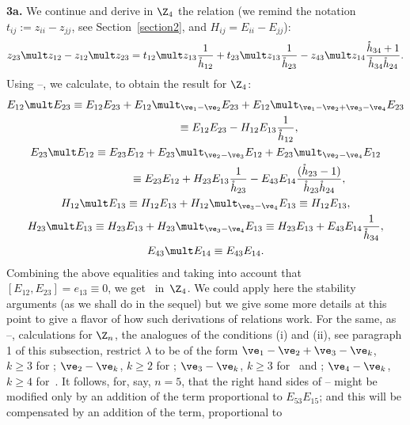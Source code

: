 \documentclass[11pt]{article}
\def\nplus{\mathfrak{n}}\def\nn{\nonumber}\def\nin{\noindent}
\def\s{z}\def\S{\mathrm {S}}\def\si{\sigma}\def\Sp{\S^{\nplus}}\def\sy{\acute{\sigma}}\def\th{\mathring{h}}
\numberwithin{equation}{section}
\begin{document}
{\bf 3a.} We continue and derive in $\Z_4$ the relation (we remind the notation $t_{ij}:=\s_{ii}-\s_{jj}$,
see Section~\ref{section2},
and $H_{ij}=E_{ii}-E_{jj}$):
\begin{gather} \label{proof12}
\s_{23}\mult\s_{12}-\s_{12}\mult\s_{23}=t_{12}\mult\s_{13}
 \frac{1}{\th_{12}}+t_{23}\mult\s_{13}  \frac{1}{\th_{23}}-\s_{43}\mult\s_{14}  \frac{\th_{34}+1}{\th_{34}\th_{24}}  .
\end{gather}
Using --, we calculate, to obtain the result for $\Z_4$:
\begin{gather}E_{12}\mult E_{23} \equiv E_{12}E_{23}+ E_{12}\mult_{\ve_1-\ve_2} E_{23}+
E_{12}\mult_{\ve_1-\ve_2+\ve_3-\ve_4} E_{23} \nonumber\\
\phantom{E_{12}\mult E_{23}}{}
 \equiv E_{12}E_{23}-H_{12}E_{13} \frac{1}{\th_{12}}  ,\label{1223r1}\\
  E_{23}\mult E_{12} \equiv E_{23}E_{12}+ E_{23}\mult_{\ve_2-\ve_3} E_{12}+
E_{23}\mult_{\ve_2-\ve_4} E_{12}\notag\\
\phantom{E_{23}\mult E_{12}}{} \equiv E_{23}E_{12}+H_{23}E_{13}  \frac{1}{\th_{23}}-E_{43}E_{14} \frac{(\th_{23}-1)}{\th_{23}
\th_{24}} ,\label{1223r2}\\
  H_{12}\mult E_{13} \equiv H_{12} E_{13}+H_{12}\mult_{\ve_3-\ve_4} E_{13}\equiv
H_{12} E_{13}  ,\label{1223r3}\\
  H_{23}\mult E_{13} \equiv H_{23} E_{13}+H_{23}\mult_{\ve_3-\ve_4} E_{13}\equiv
H_{23} E_{13}+E_{43}E_{14}  \frac{1}{\th_{34}}  ,\label{1223r4}\\
  E_{43}\mult E_{14} \equiv E_{43}E_{14} .\label{1223r5}
  \end{gather}
Combining the above equalities and taking into account that $[E_{12},E_{23}]=e_{13}\equiv 0$,
we get~ in~$\Z_4$. We could apply here the stability arguments (as we shall do in the sequel)
but we give some more details at this point to give a f\/lavor of how such derivations of relations work.
For the same, as --, calculations for $\Z_n$, the analogues of the conditions (i)
and (ii), see paragraph 1 of this subsection, restrict $\lambda$ to be of the form $\ve_1-\ve_2+\ve_3-\ve_k$, $k\geq 3$ for
; $\ve_2-\ve_k$, $k\geq 2$ for ; $\ve_3-\ve_k$, $k\geq 3$ for~
and ; $\ve_4-\ve_k$, $k\geq 4$ for~. It follows, for, say, $n=5$, that the right
hand sides of -- might be modif\/ied only by an addition of the term proportional to
$E_{53}E_{15}$; and this will be compensated by an addition of the term, proportional to
\end{document}
